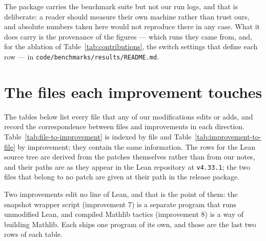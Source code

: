 \documentclass{article}
\newcommand{\Lean}{Lean\xspace}      %
\newcommand{\mathlib}{Mathlib\xspace}
\begin{document}
The package carries the benchmark suite but not our run logs, and that is deliberate: a reader
should measure their own machine rather than trust ours, and absolute numbers taken here would not
reproduce there in any case. What it does carry is the provenance of the figures --- which runs
they came from, and, for the ablation of Table~\ref{tab:contributions}, the switch settings that
define each row --- in \texttt{code/benchmarks/results/README.md}.

\section{The files each improvement touches}
\label{app:files}

The tables below list every file that any of our modifications edits or adds, and record the correspondence between files and improvements in each direction. Table~\ref{tab:file-to-improvement} is indexed by file and Table~\ref{tab:improvement-to-file} by improvement; they contain the same information. The rows for the \Lean source tree are derived from the patches themselves rather than from our notes, and their paths are as they appear in the \Lean repository at \texttt{v4.33.1}; the two files that belong to no patch are given at their path in the release package.

Two improvements edit no line of \Lean, and that is the point of them: the snapshot wrapper script (improvement 7) is a separate program that runs unmodified \Lean, and compiled \mathlib tactics (improvement 8) is a way of building \mathlib. Each ships one program of its own, and those are the last two rows of each table.
\end{document}

